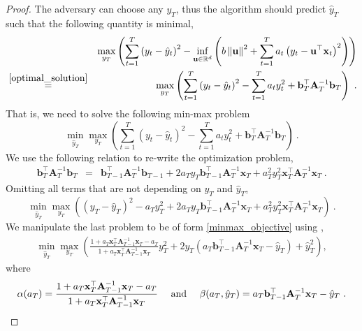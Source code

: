 \begin{proof}
The adversary can choose any $y_{T}$, thus the algorithm should predict
$\hat{y}_{T}$ such that the following quantity is minimal,
\begin{eqnarray*}
&&\max_{y_{T}}\left(\sum_{t=1}^{T}\left(y_{t}-\hat{y}_{t}\right)^{2}-\inf_{\mathbf{u}\in\mathbb{R}^{d}}\left(b\left\Vert \mathbf{u}\right\Vert ^{2}+\sum_{t=1}^{T}a_{t}\left(y_{t}-\mathbf{u}^{\top}\mathbf{x}_{t}\right)^{2}\right)\right)\\
&\overset{\eqref{optimal_solution}}{=}&\max_{y_{T}}\left(\sum_{t=1}^{T}\left(y_{t}-\hat{y}_{t}\right)^{2}-\sum_{t=1}^{T}a_{t}y_{t}^{2}+\mathbf{b}_{T}^{\top}\mathbf{A}_{T}^{-1}\mathbf{b}_{T}\right) ~.
\end{eqnarray*}
That is, we need to solve the following min-max problem
\[
\min_{\hat{y}_{T}}\max_{y_{T}}\left(\sum_{t=1}^{T}\left(y_{t}-\hat{y}_{t}\right)^{2}-\sum_{t=1}^{T}a_{t}y_{t}^{2}+\mathbf{b}_{T}^{\top}\mathbf{A}_{T}^{-1}\mathbf{b}_{T}\right)~.
\]
We use the following relation to re-write the optimization problem,
\begin{align}
\mathbf{b}_{T}^{\top}\mathbf{A}_{T}^{-1}\mathbf{b}_{T}
 & = &
 \mathbf{b}_{T-1}^{\top}\mathbf{A}_{T}^{-1}\mathbf{b}_{T-1}+2a_{T}y_{T}\mathbf{b}_{T-1}^{\top}\mathbf{A}_{T}^{-1}\mathbf{x}_{T}+a_{T}^{2}y_{T}^{2}\mathbf{x}_{T}^{\top}\mathbf{A}_{T}^{-1}\mathbf{x}_{T} ~.\label{t3}
\end{align}
Omitting all terms that are
not depending on $y_{T}$ and $\hat{y}_{T}$,
\[
\min_{\hat{y}_{T}}\max_{y_{T}}\left(\left(y_{T}-\hat{y}_{T}\right)^{2}-a_{T}y_{T}^{2}+2a_{T}y_{T}\mathbf{b}_{T-1}^{\top}\mathbf{A}_{T}^{-1}\mathbf{x}_{T}+a_{T}^{2}y_{T}^{2}\mathbf{x}_{T}^{\top}\mathbf{A}_{T}^{-1}\mathbf{x}_{T}\right)~.
\]
We manipulate the last problem to be of form \eqref{minmax_objective} using ,
\begin{align}
\min_{\hat{y}_{T}}\max_{y_{T}} \left(\!
  \frac{1+a_{T}\mathbf{x}_{T}^{\top}\mathbf{A}_{T-1}^{-1}\mathbf{x}_{T}-a_{T}}{1+a_{T}\mathbf{x}_{T}^{\top}\mathbf{A}_{T-1}^{-1}\mathbf{x}_{T}}y_{T}^{2}+2y_{T}\left(a_{T}\mathbf{b}_{T-1}^{\top}\mathbf{A}_{T}^{-1}\mathbf{x}_{T}-\hat{y}_{T}\right)+\hat{y}_{T}^{2}
\!\right),\label{minmax}
\end{align}
where
\[
\alpha(a_T)=\frac{1+a_{T}\mathbf{x}_{T}^{\top}\mathbf{A}_{T-1}^{-1}\mathbf{x}_{T}-a_{T}}{1+a_{T}\mathbf{x}_{T}^{\top}\mathbf{A}_{T-1}^{-1}\mathbf{x}_{T}}
\quad\textrm{ and }\quad
\beta(a_T,\hat{y}_{T})=a_{T}\mathbf{b}_{T-1}^{\top}\mathbf{A}_{T}^{-1}\mathbf{x}_{T}-\hat{y}_{T}~.
\]


\end{proof}
